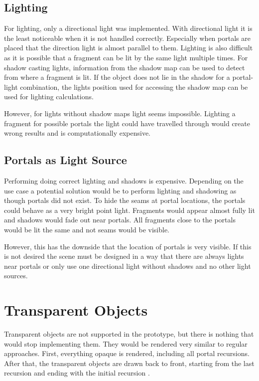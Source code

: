 \subsection{Lighting}
For lighting, only a directional light was implemented. With directional light it is the least noticeable when it is not handled correctly. Especially when portals are placed that the direction light is almost parallel to them.
Lighting is also difficult as it is possible that a fragment can be lit by the same light multiple times. For shadow casting lights, information from the shadow map can be used to detect from where a fragment is lit. If the object does not lie in the shadow for a portal-light combination, the lights position used for accessing the shadow map can be used for lighting calculations.

However, for lights without shadow maps light seems impossible. Lighting a fragment for possible portals the light could have travelled through would create wrong results and is computationally expensive. 


\subsection{Portals as Light Source}
\label{section:portalsaslights}
Performing doing correct lighting and shadows is expensive. Depending on the use case a potential solution would be to perform lighting and shadowing as though portals did not exist. To hide the seams at portal locations, the portals could behave as a very bright point light. Fragments would appear almost fully lit and shadows would fade out near portals. All fragments close to the portals would be lit the same and not seams would be visible.

However, this has the downside that the location of portals is very visible. If this is not desired the scene must be designed in a way that there are always lights near portals or only use one directional light without shadows and no other light sources.


\section{Transparent Objects}
Transparent objects are not supported in the prototype, but there is nothing that would stop implementing them. They would be rendered very similar to regular approaches. First, everything opaque is rendered, including all portal recursions. After that, the transparent objects are drawn back to front, starting from the last recursion and ending with the initial recursion \cite{lecture:portalProblems}.


